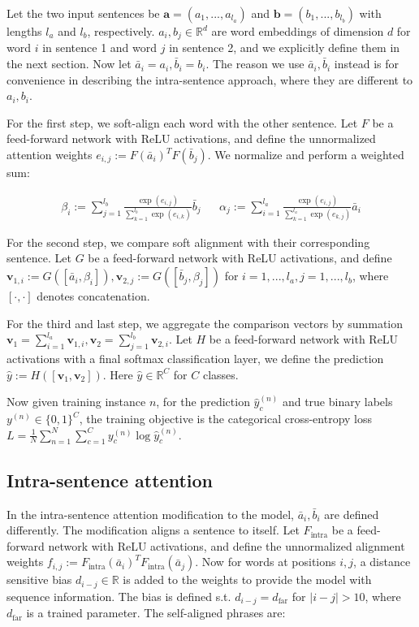 \documentclass{article}
\begin{document}
Let the two input sentences be $\textbf{a}=(a_1,...,a_{l_a})$ and $\textbf{b}=(b_1,...,b_{l_b})$ with lengths $l_a$ and $l_b$, respectively. $a_i, b_j\in\mathbb{R}^d$ are word embeddings of dimension $d$ for word $i$ in sentence 1 and word $j$ in sentence 2, and we explicitly define them in the next section. Now let $\bar{a}_i = a_i, \bar{b}_i = b_i$. The reason we use $\bar{a}_i, \bar{b}_i$ instead is for convenience in describing the intra-sentence approach, where they are different to $a_i, b_i$.

For the first step, we soft-align each word with the other sentence. Let $F$ be a feed-forward network with ReLU activations, and define the unnormalized attention weights $e_{i,j} := F(\bar{a}_i)^T F(\bar{b}_j)$. We normalize and perform a weighted sum:

\begin{align*}
    \beta_i := \sum_{j=1}^{l_b} \frac{\exp(e_{i,j})}{\sum_{k=1}^{l_b}\exp(e_{i,k})} \bar{b}_j &&
    \alpha_j := \sum_{i=1}^{l_a} \frac{\exp(e_{i,j})}{\sum_{k=1}^{l_a}\exp(e_{k,j})} \bar{a}_i
\end{align*}

For the second step, we compare soft alignment with their corresponding sentence. Let $G$ be a feed-forward network with ReLU activations, and define $\mathbf{v}_{1,i} := G([\bar{a}_i, \beta_i]), \mathbf{v}_{2,j} := G([\bar{b}_j, \beta_j])$ for $i=1,...,l_a, j=1,...,l_b$, where $[\cdot, \cdot]$ denotes concatenation.

For the third and last step, we aggregate the comparison vectors by summation $\mathbf{v}_1 = \sum_{i=1}^{l_a}\mathbf{v}_{1,i}, \mathbf{v}_2 = \sum_{j=1}^{l_b}\mathbf{v}_{2,i}$. Let $H$ be a feed-forward network with ReLU activations with a final softmax classification layer, we define the prediction $\hat{y} := H([\mathbf{v}_1, \mathbf{v}_2])$. Here $\hat{y}\in\mathbb{R}^C$ for $C$ classes.

Now given training instance $n$, for the prediction $\hat{y}_c^{(n)}$ and true binary labels $y^{(n)}\in\{0, 1\}^C$, the training objective is the categorical cross-entropy loss $L = \frac{1}{N} \sum_{n=1}^N \sum_{c=1}^C y_c^{(n)} \log \hat{y}_c^{(n)}$.

\subsection{Intra-sentence attention}
In the intra-sentence attention modification to the model, $\bar{a}_i, \bar{b}_i$ are defined differently. The modification aligns a sentence to itself. Let $F_\text{intra}$ be a feed-forward network with ReLU activations, and define the unnormalized alignment weights $f_{i,j} := F_\text{intra}(\bar{a}_i)^T F_\text{intra}(\bar{a}_j)$. Now for words at positions $i, j$, a distance sensitive bias $d_{i-j}\in\mathbb{R}$ is added to the weights to provide the model with sequence information. The bias is defined s.t. $d_{i-j} = d_\text{far}$ for $|i-j| > 10$, where $d_\text{far}$ is a trained parameter. The self-aligned phrases are:
\end{document}
